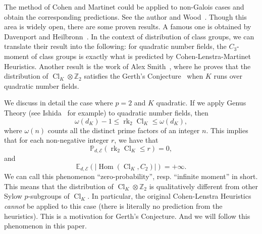 \documentclass{amsart}
\numberwithin{equation}{section}
\theoremstyle{plain}
\theoremstyle{definition}
\theoremstyle{remark}
\begin{document}
The method of Cohen and Martinet could be applied to non-Galois cases and obtain the corresponding predictions.
See the author and Wood~\cite{wang2021moments}.
Though this area is widely open, there are some proven results.
A famous one is obtained by Davenport and Heilbronn~\cite{Davenport1971Cubic}.
In the context of distribution of class groups, we can translate their result into the following: 
for quadratic number fields, the $C_3$-moment of class groups is exactly what is predicted by Cohen-Lenstra-Martinet Heuristics.
Another result is the work of Alex Smith~\cite{smith2022distribution}, where he proves that the distribution of $\operatorname{Cl}_K\otimes\mathbb{Z}_2$ satisfies the Gerth's Conjecture~\cite{Gerth1987} when $K$ runs over quadratic number fields.

We discuss in detail the case where $p=2$ and $K$ quadratic.
If we apply Genus Theory (see Ishida~\cite{ishida1976genus} for example) to quadratic number fields, then
\begin{equation*}
	\omega(d_K)-1\leq\operatorname{rk}_2\operatorname{Cl}_K\leq\omega(d_K),
\end{equation*}
where $\omega(n)$ counts all the distinct prime factors of an integer $n$.
This implies that for each non-negative integer $r$, we have that
\begin{equation*}
	\mathbb{P}_{d,\mathcal{E}}(\operatorname{rk}_2\operatorname{Cl}_K\leq r)=0,
\end{equation*}
and
\begin{equation*}
	\mathbb{E}_{d,\mathcal{E}}(\lvert\operatorname{Hom}(\operatorname{Cl}_K,C_2)\rvert)=+\infty.
\end{equation*}
We can call this phenomenon ``zero-probability'', resp. ``infinite moment'' in short.
This means that the distribution of $\operatorname{Cl}_K\otimes\mathbb{Z}_2$ is qualitatively different from other Sylow $p$-subgroups of $\operatorname{Cl}_K$.
In particular, the original Cohen-Lenstra Heuristics \emph{cannot} be applied to this case (there is literally no prediction from the heuristics).
This is a motivation for Gerth's Conjecture.
And we will follow this phenomenon in this paper.
\end{document}

